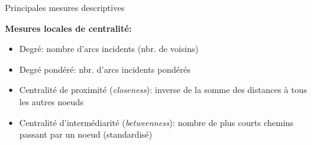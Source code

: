 \begin{frame}{Principales mesures descriptives}

\textbf{Mesures locales de centralité:}

\begin{itemize}
\item Degré: nombre d'arcs incidents (nbr. de voisins)
\item Degré pondéré: nbr. d’arcs incidents pondérés
\item Centralité de proximité (\textit{closeness}): inverse de la somme des distances à tous les autres noeuds
\item Centralité d'intermédiarité (\textit{betweenness}): nombre de plus courts chemins passant par un noeud (standardisé)
\end{itemize}


\end{frame}
